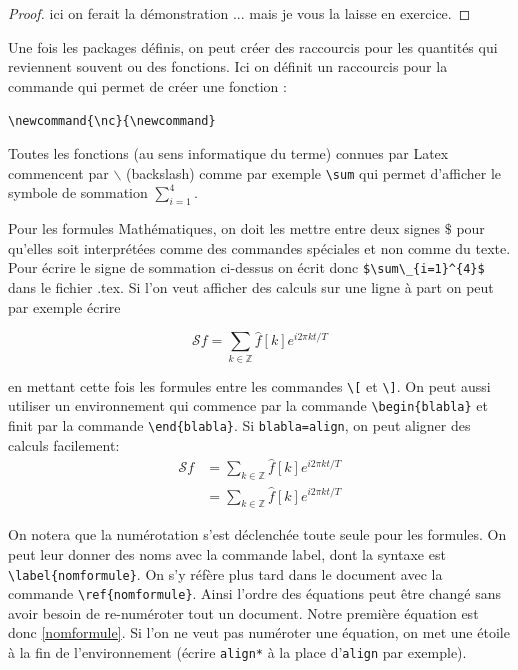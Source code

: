 \documentclass[a4paper,10pt]{book_ad}
\begin{document}
\begin{proof}
 ici on ferait la démonstration ... mais  je vous la laisse en exercice.
\end{proof}



Une fois les packages définis, on peut créer des raccourcis pour les quantités qui reviennent 
souvent ou des fonctions. Ici on définit un raccourcis pour la commande qui permet de créer une
 fonction :\medskip

\lstinline+\newcommand{\nc}{\newcommand}+

\begin{rem}
 Toutes les fonctions (au sens informatique du terme) connues par Latex commencent par $\backslash$ 
(backslash) comme par exemple \lstinline+\sum+
 qui permet d'afficher le symbole de sommation $\sum_{i=1}^{4}$. 
\end{rem}


Pour les formules Mathématiques, on doit  les mettre entre deux signes 
$\$$ pour qu'elles soit interprétées comme des commandes spéciales et non comme du texte. 
Pour écrire le signe de sommation ci-dessus on écrit donc \lstinline+$\sum\_{i=1}^{4}$+ dans le 
fichier .tex. Si l'on veut afficher des calculs sur une ligne à part on peut par exemple écrire 

\[\mathcal{S}f = \sum_{k\in\mathbb{Z}} \hat{f}[k] e^{i2\pi kt/T} \] 

en mettant cette fois les formules  entre  les commandes 
\lstinline+\[+ et \lstinline+\]+. On peut aussi utiliser un environnement qui commence par la 
commande 
\lstinline+\begin{blabla}+ et finit par la commande \lstinline+\end{blabla}+. Si \lstinline+blabla=align+, 
on peut aligner des calculs facilement:
\begin{align}
 \mathcal{S}f & = \sum_{k\in\mathbb{Z}} \hat f[k] e^{i2\pi kt/T} \label{nomformule}\\
  & = \sum_{k\in\mathbb{Z}} \hat f[k] e^{i2\pi kt/T}
\end{align}

\begin{rem}
On notera que la numérotation s'est déclenchée toute seule pour les formules. 
On peut  leur donner des noms avec la commande label,  dont la syntaxe est  \lstinline+\label{nomformule}+.  
On s'y réfère plus tard dans le document  avec la commande \lstinline+\ref{nomformule}+. 
Ainsi l'ordre des équations peut être changé sans avoir besoin de re-numéroter tout un document. 
Notre première équation est donc \ref{nomformule}. 
Si l'on ne veut pas numéroter une équation,  on met une étoile à la fin de l'environnement 
(écrire \lstinline+align*+ à la place d'\lstinline+align+ par exemple).
\end{rem}
\end{document}
